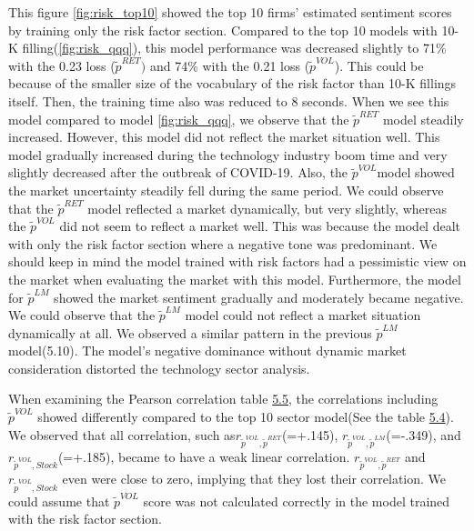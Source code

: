 \documentclass[logo,bsc,singlespacing,parskip]{infthesis}
\begin{document}
This figure \ref{fig:risk_top10} showed the top 10 firms’ estimated sentiment scores by training only the risk factor section. Compared to the top 10 models with 10-K filling(\ref{fig:risk_qqq}), this model performance was decreased slightly to 71\% with the 0.23 loss ($\tilde{p}^{RET})$ and 74\% with the 0.21 loss ($\tilde{p}^{VOL}$). This could be because of the smaller size of the vocabulary of the risk factor than 10-K fillings itself. Then, the training time also was reduced to 8 seconds. When we see this model compared to model \ref{fig:risk_qqq}, we observe that the $\tilde{p}^{RET}$ model steadily increased. However, this model did not reflect the market situation well. This model gradually increased during the technology industry boom time and very slightly decreased after the outbreak of COVID-19. Also, the $\tilde{p}^{VOL}$model showed the market uncertainty steadily fell during the same period. We could observe that the $\tilde{p}^{RET}$ model reflected a market dynamically, but very slightly, whereas the $\tilde{p}^{VOL}$ did not seem to reflect a market well. This was because the model dealt with only the risk factor section where a negative tone was predominant. We should keep in mind the model trained with risk factors had a pessimistic view on the market when evaluating the market with this model. Furthermore, the model for $\tilde{p}^{LM}$ showed the market sentiment gradually and moderately became negative. We could observe that the $\tilde{p}^{LM}$ model could not reflect a market situation dynamically at all. We observed a similar pattern in the previous $\tilde{p}^{LM}$ model(5.10). The model’s negative dominance without dynamic market consideration distorted the technology sector analysis. 

When examining the Pearson correlation table \hyperref[tab:risk_top10_corr]{5.5}, the correlations including $\tilde{p}^{VOL}$ showed differently compared to the top 10 sector model(See the table \hyperref[tab:all_top10_corr]{5.4}). We observed that all correlation, such as$r_{\tilde{p}^{VOL},\tilde{p}^{RET}}$(=+.145), $r_{\tilde{p}^{VOL},\tilde{p}^{LM}}$(=-.349), and $r_{\tilde{p}^{VOL},Stock}$(=+.185), became to have a weak linear correlation. $r_{\tilde{p}^{VOL},\tilde{p}^{RET}}$ and $r_{\tilde{p}^{VOL},Stock}$ even were close to zero, implying that they lost their correlation. We could assume that $\tilde{p}^{VOL}$ score was not calculated correctly in the model trained with the risk factor section. 
\end{document}

